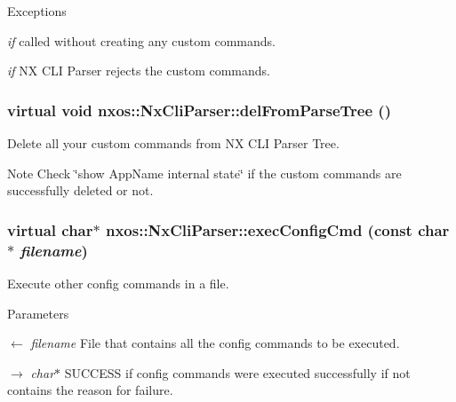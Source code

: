 \begin{DoxyExceptions}{Exceptions}
\item[{\em if}]called without creating any custom commands. \item[{\em if}]NX CLI Parser rejects the custom commands. \end{DoxyExceptions}
\hypertarget{classnxos_1_1NxCliParser_a169976099ecf7a05277bfc72259ff1bc}{
\subsubsection[{delFromParseTree}]{\setlength{\rightskip}{0pt plus 5cm}virtual void nxos::NxCliParser::delFromParseTree ()}}
\label{classnxos_1_1NxCliParser_a169976099ecf7a05277bfc72259ff1bc}
Delete all your custom commands from NX CLI Parser Tree. \begin{DoxyNote}{Note}
Check \char`\"{}show AppName internal state\char`\"{} if the custom commands are successfully deleted or not. 
\end{DoxyNote}
\hypertarget{classnxos_1_1NxCliParser_aa22ee0395ceadc46a3e28b93c5a5b75e}{
\subsubsection[{execConfigCmd}]{\setlength{\rightskip}{0pt plus 5cm}virtual char$\ast$ nxos::NxCliParser::execConfigCmd (const char $\ast$ {\em filename})}}
\label{classnxos_1_1NxCliParser_aa22ee0395ceadc46a3e28b93c5a5b75e}
Execute other config commands in a file. 
\begin{DoxyParams}{Parameters}
\item[\mbox{$\leftarrow$} {\em filename}]File that contains all the config commands to be executed. \item[\mbox{$\rightarrow$} {\em char$\ast$}]SUCCESS if config commands were executed successfully if not contains the reason for failure.\end{DoxyParams}

